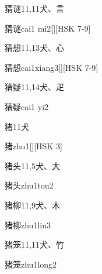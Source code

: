\begin{Entry}{猜谜}{11,11}{⽝、⾔}
  \begin{Phonetics}{猜谜}{cai1 mi2}[][HSK 7-9]
  \end{Phonetics}
\end{Entry}

\begin{Entry}{猜想}{11,13}{⽝、⼼}
  \begin{Phonetics}{猜想}{cai1xiang3}[][HSK 7-9]
  \end{Phonetics}
\end{Entry}

\begin{Entry}{猜疑}{11,14}{⽝、⽦}
  \begin{Phonetics}{猜疑}{cai1 yi2}
  \end{Phonetics}
\end{Entry}

\begin{Entry}{猪}{11}{⽝}
  \begin{Phonetics}{猪}{zhu1}[][HSK 3]
  \end{Phonetics}
\end{Entry}

\begin{Entry}{猪头}{11,5}{⽝、⼤}
  \begin{Phonetics}{猪头}{zhu1tou2}
  \end{Phonetics}
\end{Entry}

\begin{Entry}{猪柳}{11,9}{⽝、⽊}
  \begin{Phonetics}{猪柳}{zhu1liu3}
  \end{Phonetics}
\end{Entry}

\begin{Entry}{猪笼}{11,11}{⽝、⽵}
  \begin{Phonetics}{猪笼}{zhu1long2}
  \end{Phonetics}
\end{Entry}

